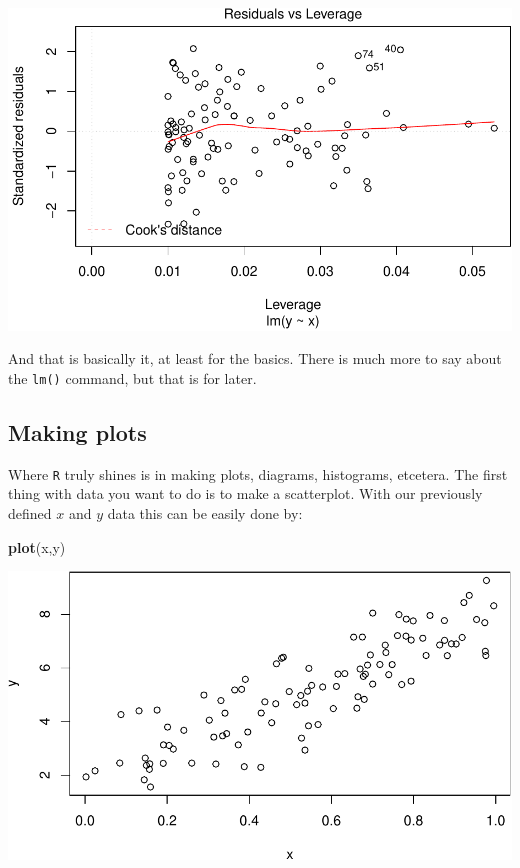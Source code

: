 \documentclass[]{article}
\newenvironment{Shaded}{\begin{snugshade}}{\end{snugshade}}
\newcommand{\KeywordTok}[1]{\textcolor[rgb]{0.13,0.29,0.53}{\textbf{{#1}}}}
\newcommand{\NormalTok}[1]{{#1}}
\theoremstyle{definition}
\theoremstyle{definition}
\theoremstyle{definition}
\theoremstyle{remark}
\begin{document}
\includegraphics{./unnamed-chunk-26-4.pdf}

And that is basically it, at least for the basics. There is much more to
say about the \texttt{lm()} command, but that is for later.

\subsection{Making plots}\label{making-plots}

Where \texttt{R} truly shines is in making plots, diagrams, histograms,
etcetera. The first thing with data you want to do is to make a
scatterplot. With our previously defined \(x\) and \(y\) data this can
be easily done by:

\begin{Shaded}
\begin{Highlighting}[]
\KeywordTok{plot}\NormalTok{(x,y)}
\end{Highlighting}
\end{Shaded}

\includegraphics{./unnamed-chunk-27-1.pdf}
\end{document}
